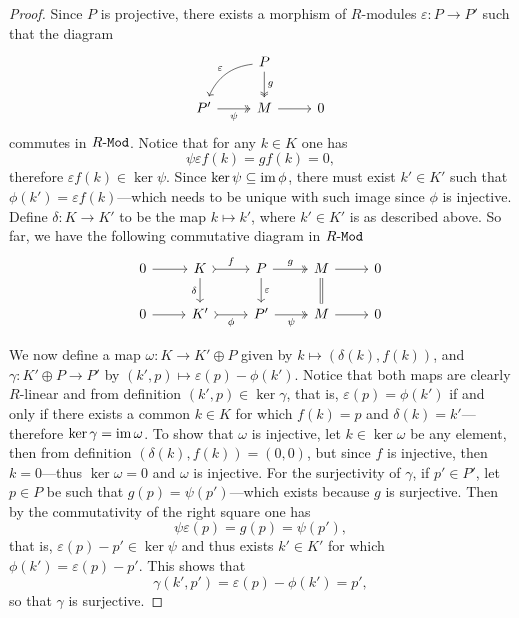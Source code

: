 \begin{proof}
    Since \(P\) is projective, there exists a morphism of \(R\)-modules
    \(\varepsilon: P \to P'\) such that the diagram
    \[
        \begin{tikzcd}
            &P \ar[d, two heads, "g"] \ar[ld, bend right, "\varepsilon"'] &
            \\
            P' \ar[r, two heads, "\psi"'] &M \ar[r] &0
        \end{tikzcd}
    \]
    commutes in \({R\text{-}\texttt{Mod}}\). Notice that for any \(k \in K\) one has
    \[
        \psi \varepsilon f(k) = g f(k) = 0,
    \]
    therefore \(\varepsilon f(k) \in \ker \psi\). Since
    \(\ker \psi \subseteq \operatorname{im} \phi\), there must exist \(k' \in K'\) such that
    \(\phi(k') = \varepsilon f(k)\)---which needs to be unique with such image since
    \(\phi\) is injective. Define \(\delta: K \to K'\) to be the map
    \(k \mapsto k'\), where \(k' \in K'\) is as described above. So far, we have the
    following commutative diagram in \({R\text{-}\texttt{Mod}}\)
    \[
        \begin{tikzcd}
            0 \ar[r]
            &K \ar[r, tail, "f"] \ar[d, "\delta"']
            &P \ar[r, two heads, "g"] \ar[d, "\varepsilon"]
            &M \ar[r] \ar[d, equals]
            &0
            \\
            0 \ar[r] &K' \ar[r, tail, "\phi"'] &P' \ar[r, two heads, "\psi"'] &M \ar[r] &0
        \end{tikzcd}
    \]

    We now define a map \(\omega: K \to K' \oplus P\) given by
    \(k \mapsto (\delta(k), f(k))\), and \(\gamma: K' \oplus P \to P'\) by
    \((k', p) \mapsto \varepsilon(p) - \phi(k')\). Notice that both maps are clearly
    \(R\)-linear and from definition \((k', p) \in \ker \gamma\), that is,
    \(\varepsilon(p) = \phi(k')\) if and only if there exists a common \(k \in K\)
    for which \(f(k) = p\) and \(\delta(k) = k'\)---therefore
    \(\ker \gamma = \operatorname{im} \omega\). To show that \(\omega\) is injective, let
    \(k \in \ker \omega\) be any element, then from definition
    \((\delta(k), f(k)) = (0, 0)\), but since \(f\) is injective, then
    \(k = 0\)---thus \(\ker \omega = 0\) and \(\omega\) is injective. For the
    surjectivity of \(\gamma\), if \(p' \in P'\), let \(p \in P\) be such that
    \(g(p) = \psi(p')\)---which exists because \(g\) is surjective. Then by the
    commutativity of the right square one has
    \[
        \psi \varepsilon(p) = g(p) = \psi(p'),
    \]
    that is, \(\varepsilon(p) - p' \in \ker \psi\) and thus exists \(k' \in K'\) for
    which \(\phi(k') = \varepsilon(p) - p'\). This shows that
    \[
        \gamma(k', p') = \varepsilon(p) - \phi(k') = p',
    \]
    so that \(\gamma\) is surjective.


\end{proof}
